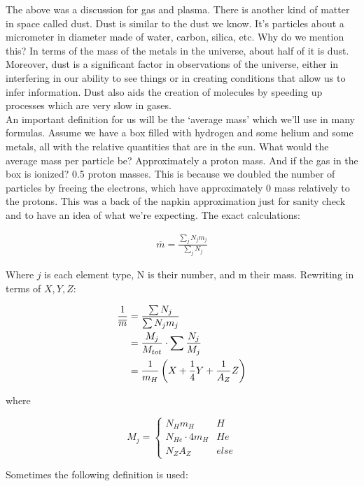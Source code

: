 The above was a discussion for gas and plasma. There is another kind of matter in space called dust. Dust is similar to the dust we know. It's particles about a micrometer in diameter made of water, carbon, silica, etc. Why do we mention this? In terms of the mass of the metals in the universe, about half of it is dust. Moreover, dust is a significant factor in observations of the universe, either in interfering in our ability to see things or in creating conditions that allow us to infer information. Dust also aids the creation of molecules by speeding up processes which are very slow in gases. \bigskip \\ An important definition for us will be the `average mass' which we'll use in many formulas. Assume we have a box filled with hydrogen and some helium and some metals, all with the relative quantities that are in the sun. What would the average mass per particle be? Approximately a proton mass. And if the gas in the box is ionized? 0.5 proton masses. This is because we doubled the number of particles by freeing the electrons, which have approximately 0 mass relatively to the protons. This was a back of the napkin approximation just for sanity check and to have an idea of what we're expecting. The exact calculations:

\begin{align}
	\overline{m} = \frac{\sum\limits_j N_j m_j}{\sum\limits_j N_j}
\end{align}

Where \(j\) is each element type, N is their number, and m their mass. Rewriting in terms of \(X,Y,Z\):

\begin{align}
	\frac{1}{\overline{m}} &= \frac{\sum N_j}{\sum N_j m_j}\\
	&= \frac{M_j}{M_{tot}}\cdot\sum\frac{N_j}{M_j}\\
	&= \frac{1}{m_H}\left(X+\frac{1}{4}Y + \frac{1}{A_Z}Z\right)
\end{align}


where

\begin{equation}
	M_j = \begin{cases}
		N_H m_H & H\\
		N_{He} \cdot 4m_H & He\\
		N_Z A_Z & else
	\end{cases}
\end{equation}

Sometimes the following definition is used:

